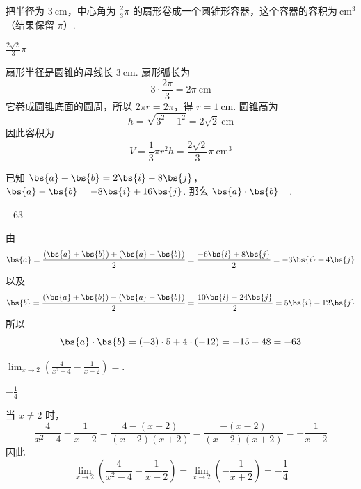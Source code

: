 \begin{problem}[A]
把半径为 \(3\mathrm{~cm}\)，中心角为 \(\frac{2}{3}\pi\) 的扇形卷成一个圆锥形容器，这个容器的容积为\fillinblank{}\(\mathrm{~cm}^3\)（结果保留 \(\pi\)）.
\end{problem}

\begin{answer}
\(\frac{2\sqrt{2}}{3}\pi\)
\end{answer}

\begin{solution}
扇形半径是圆锥的母线长 \(3\mathrm{~cm}\). 扇形弧长为
\[
3\cdot\frac{2\pi}{3}=2\pi\mathrm{~cm}
\]
它卷成圆锥底面的圆周，所以 \(2\pi r=2\pi\)，得 \(r=1\mathrm{~cm}\). 圆锥高为
\[
h=\sqrt{3^2-1^2}=2\sqrt{2}\mathrm{~cm}
\]
因此容积为
\[
V=\frac{1}{3}\pi r^2h=\frac{2\sqrt{2}}{3}\pi\mathrm{~cm}^3
\]
\end{solution}

\setcounter{probnum}{14}
\begin{problem}[B]
已知 \(\bs{a}+\bs{b}=2\bs{i}-8\bs{j}\)，\(\bs{a}-\bs{b}=-8\bs{i}+16\bs{j}\). 那么 \(\bs{a}\cdot\bs{b}=\)\fillinblank{}.
\end{problem}

\begin{answer}
\(-63\)
\end{answer}

\begin{solution}
由
\[
\bs{a}=\frac{(\bs{a}+\bs{b})+(\bs{a}-\bs{b})}{2}
=\frac{-6\bs{i}+8\bs{j}}{2}
=-3\bs{i}+4\bs{j}
\]
以及
\[
\bs{b}=\frac{(\bs{a}+\bs{b})-(\bs{a}-\bs{b})}{2}
=\frac{10\bs{i}-24\bs{j}}{2}
=5\bs{i}-12\bs{j}
\]
所以
\[
\bs{a}\cdot\bs{b}=(-3)\cdot5+4\cdot(-12)=-15-48=-63
\]
\end{solution}

\begin{problem}[B]
\(\displaystyle\lim_{x\to 2}\left(\frac{4}{x^2-4}-\frac{1}{x-2}\right)=\)\fillinblank{}.
\end{problem}

\begin{answer}
\(-\frac{1}{4}\)
\end{answer}

\begin{solution}
当 \(x\ne2\) 时，
\[
\frac{4}{x^2-4}-\frac{1}{x-2}
=\frac{4-(x+2)}{(x-2)(x+2)}
=\frac{-(x-2)}{(x-2)(x+2)}
=-\frac{1}{x+2}
\]
因此
\[
\lim_{x\to2}\left(\frac{4}{x^2-4}-\frac{1}{x-2}\right)
=\lim_{x\to2}\left(-\frac{1}{x+2}\right)
=-\frac{1}{4}
\]
\end{solution}


